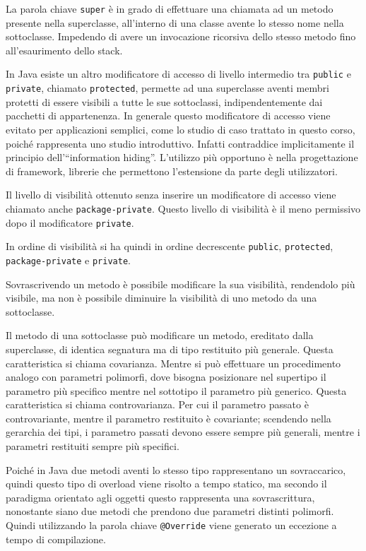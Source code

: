 \documentclass{article}
\numberwithin{equation}{subsection}
\begin{document}

La parola chiave \verb|super| è in grado di effettuare una chiamata ad un metodo presente nella superclasse, all'interno di una classe avente lo stesso nome nella 
sottoclasse. Impedendo di avere un invocazione ricorsiva dello stesso metodo fino all'esaurimento dello stack. 


In Java esiste un altro modificatore di accesso di livello intermedio tra \verb|public| e \verb|private|, chiamato \verb|protected|, permette ad una superclasse aventi 
membri protetti di essere visibili a tutte le sue sottoclassi, indipendentemente dai pacchetti di appartenenza. 
In generale questo modificatore di accesso viene evitato per applicazioni semplici, come lo studio di caso trattato in questo corso, poiché rappresenta uno studio 
introduttivo. Infatti contraddice implicitamente il principio dell'``information hiding''. 
L'utilizzo più opportuno è nella progettazione di framework, librerie che permettono l'estensione da parte degli utilizzatori. 

Il livello di visibilità ottenuto senza inserire un modificatore di accesso viene chiamato anche \verb|package-private|. Questo livello di visibilità è il meno permissivo 
dopo il modificatore \verb|private|. 


In ordine di visibilità si ha quindi in ordine decrescente \verb|public|, \verb|protected|, \verb|package-private| e \verb|private|. 


Sovrascrivendo un metodo è possibile modificare la sua visibilità, rendendolo più visibile, ma non è possibile diminuire la visibilità di uno metodo da una sottoclasse. 


Il metodo di una sottoclasse può modificare un metodo, ereditato dalla superclasse, di identica segnatura ma di tipo restituito più generale. Questa caratteristica si chiama 
covarianza. 
Mentre si può effettuare un procedimento analogo con parametri polimorfi, dove bisogna posizionare nel supertipo il parametro più specifico mentre nel sottotipo il parametro 
più generico. Questa caratteristica si chiama controvarianza. 
Per cui il parametro passato è controvariante, mentre il parametro restituito è covariante; scendendo nella gerarchia dei tipi, i parametro passati devono essere sempre 
più generali, mentre i parametri restituiti sempre più specifici. 

Poiché in Java due metodi aventi lo stesso tipo rappresentano un sovraccarico, quindi questo tipo di overload viene risolto a tempo statico, ma secondo il paradigma orientato 
agli oggetti questo rappresenta una sovrascrittura, nonostante siano due metodi che prendono due parametri distinti polimorfi. Quindi utilizzando la parola chiave \verb|@Override| 
viene generato un eccezione a tempo di compilazione. 
\end{document}
